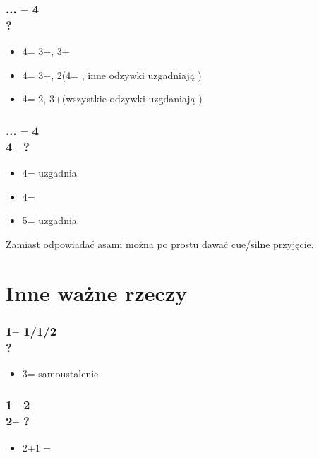 \documentclass[12pt, a4paper]{report}
\begin{document}
{    \subsubsection*{... -- 4\diams\\
                    ?}
    \begin{itemize}
        \item 4\hearts = 3+\clubs, 3+\diams
        \item 4\spades = 3+\clubs, 2\diams (4\nt = \soff, inne odzywki uzgadniają \clubs)
        \item 4\nt = 2\clubs, 3+\diams (wszystkie odzywki uzgdaniają \diams)
    \end{itemize}

    \subsubsection*{... -- 4\diams\\
                    4\hearts -- ?}
    \begin{itemize}
        \item 4\spades = uzgadnia \clubs
        \item 4\nt = \soff
        \item 5\clubs = uzgadnia \diams
    \end{itemize}

    Zamiast odpowiadać asami można po prostu dawać cue/silne przyjęcie.
}

\section*{\colorbox{blue!30}{Inne ważne rzeczy}}
 {
    \subsubsection*{1\major -- 1\spades/1\nt/2\minor\\ ?}
    \begin{itemize}
        \item 3\major = samoustalenie
    \end{itemize}

    \subsubsection*{1\major -- 2\minor \\ 2\major -- ?}
    \begin{itemize}
        \item 2\major+1 = \lsf
    \end{itemize}
}
\end{document}
